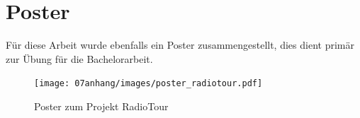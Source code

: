 \section{Poster}
Für diese Arbeit wurde ebenfalls ein Poster zusammengestellt, dies dient primär zur Übung für die Bachelorarbeit.

\begin{figure}[h!]
\caption{Poster zum Projekt RadioTour}
\centering
\texttt{[image: 07anhang/images/poster\_radiotour.pdf]}
\end{figure} 

